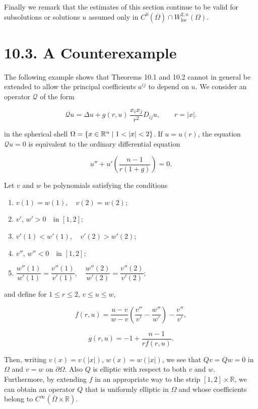 Finally we remark that the estimates of this section continue to be valid for subsolutions or solutions $u$ assumed only in $C^0(\overline{\Omega}) \cap W^{2,n}_{\mathrm{loc}}(\Omega)$.

\section*{10.3. A Counterexample}

The following example shows that Theorems 10.1 and 10.2 cannot in general be extended to allow the principal coefficients $a^{ij}$ to depend on $u$. We consider an operator $\mathcal{Q}$ of the form

\begin{equation}
\mathcal{Q}u = \Delta u + g(r,u)\,\frac{x_i x_j}{r^2} D_{ij}u,\qquad r = |x|.
\tag{10.20}
\end{equation}

in the spherical shell $\Omega = \{x \in \mathbb{R}^n \mid 1 < |x| < 2\}$. If $u = u(r)$, the equation $\mathcal{Q}u = 0$ is equivalent to the ordinary differential equation

\[
u'' + u'\left(\frac{n-1}{r(1+g)}\right) = 0.
\]



Let $v$ and $w$ be polynomials satisfying the conditions

\begin{enumerate}
\item[(i)] $v(1)=w(1), \quad v(2)=w(2);$
\item[(ii)] $v',\, w' >0 \quad \text{in } [1,2];$
\item[(iii)] $v'(1)<w'(1), \quad v'(2)>w'(2);$
\item[(iv)] $v'',\, w'' <0 \quad \text{in } [1,2];$
\item[(v)] $\dfrac{w''(1)}{w'(1)}=\dfrac{v''(1)}{v'(1)}, \quad \dfrac{w''(2)}{w'(2)}=\dfrac{v''(2)}{v'(2)};$
\end{enumerate}

and define for $1\le r\le 2$, $v\le u\le w,$

\[
f(r,u)=\frac{u-v}{w-v}\left(\frac{v''}{v'}-\frac{w''}{w'}\right)-\frac{v''}{v'},
\]

\[
g(r,u)=-1+\frac{n-1}{r f(r,u)}.
\]

Then, writing $v(x)=v(|x|)$, $w(x)=w(|x|)$, we see that $Qv=Qw=0$ in $\Omega$ and $v=w$
on $\partial\Omega$. Also $Q$ is elliptic with respect to both $v$ and $w$. Furthermore, by extending
$f$ in an appropriate way to the strip $[1,2]\times \mathbb{R}$, we can obtain an operator $Q$
that is uniformly elliptic in $\Omega$ and whose coefficients belong to $C^\infty(\overline{\Omega}\times\mathbb{R})$.


